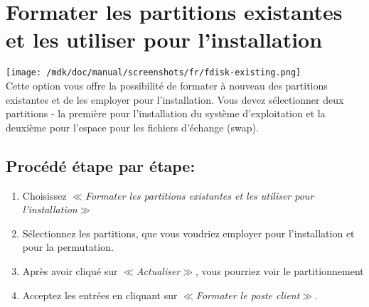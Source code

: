 \section{Formater les partitions existantes et les utiliser pour l'installation}
\texttt{[image: /mdk/doc/manual/screenshots/fr/fdisk-existing.png]} \\
Cette option vous offre la possibilit\'e de formater \`a nouveau des partitions existantes et de les employer pour l'installation. Vous devez s\'electionner deux partitions - la premi\`ere pour l'installation du syst\`eme d'exploitation et la deuxi\`eme pour l'espace pour les fichiers d'\'echange (swap).\\
\subsection{Proc\'ed\'e \'etape par \'etape:}
\begin{enumerate}
\item Choisissez \textit{$\ll$Formater les partitions existantes et les utiliser pour l'installation$\gg$}
\item S\'electionnez les partitions, que vous voudriez employer pour l'installation et pour la permutation.\\
\item Apr\`es avoir cliqu\'e sur \textit{$\ll$Actualiser$\gg$}, vous pourriez voir le partitionnement\\
\item Acceptez les entr\'ees en cliquant sur \textit{$\ll$Formater le poste client$\gg$}.\\
\end{enumerate}
